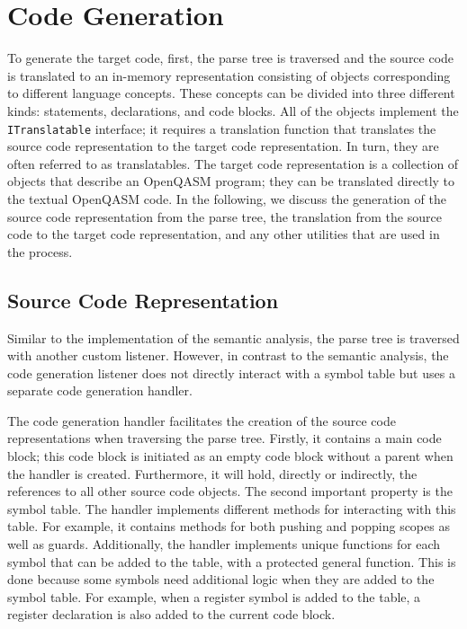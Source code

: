\section{Code Generation}
\label{sec:implementation_codeGen}
To generate the target code, first, the parse tree is traversed and the source code is translated to an in-memory representation consisting of objects corresponding to different language concepts. These concepts can be divided into three different kinds: statements, declarations, and code blocks. All of the objects implement the \texttt{ITranslatable} interface; it requires a translation function that translates the source code representation to the target code representation. In turn, they are often referred to as translatables. The target code representation is a collection of objects that describe an OpenQASM program; they can be translated directly to the textual OpenQASM code. In the following, we discuss the generation of the source code representation from the parse tree, the translation from the source code to the target code representation, and any other utilities that are used in the process.

\subsection{Source Code Representation}
\label{sec:implementation_sourceCode}
Similar to the implementation of the semantic analysis, the parse tree is traversed with another custom listener. However, in contrast to the semantic analysis, the code generation listener does not directly interact with a symbol table but uses a separate code generation handler.

The code generation handler facilitates the creation of the source code representations when traversing the parse tree. Firstly, it contains a main code block; this code block is initiated as an empty code block without a parent when the handler is created. Furthermore, it will hold, directly or indirectly, the references to all other source code objects. The second important property is the symbol table. The handler implements different methods for interacting with this table. For example, it contains methods for both pushing and popping scopes as well as guards. Additionally, the handler implements unique functions for each symbol that can be added to the table, with a protected general function. This is done because some symbols need additional logic when they are added to the symbol table. For example, when a register symbol is added to the table, a register declaration is also added to the current code block.

